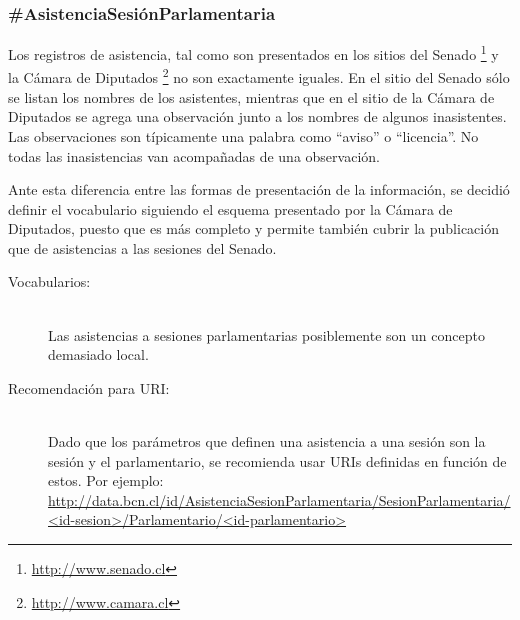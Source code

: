 \subsubsection{\#AsistenciaSesiónParlamentaria}

Los registros de asistencia, tal como son presentados en los
sitios del Senado \footnote{\url{http://www.senado.cl}} y la Cámara de
Diputados \footnote{\url{http://www.camara.cl}} no son exactamente
iguales. En el sitio del Senado sólo se listan los nombres de los
asistentes, mientras que en el sitio de la Cámara de Diputados se
agrega una observación junto a los nombres de algunos
inasistentes. Las observaciones son típicamente una palabra como
``aviso'' o ``licencia''. No todas las inasistencias van acompañadas
de una observación.

Ante esta diferencia entre las formas de presentación de la
información, se decidió definir el vocabulario siguiendo el esquema
presentado por la Cámara de Diputados, puesto que es más completo y
permite también cubrir la publicación que de asistencias a las
sesiones del Senado.

\begin{description}
  
\item[{\sf Vocabularios:}] \hfill \\
  Las asistencias a sesiones parlamentarias posiblemente son un
  concepto demasiado local.
\item[{\sf Recomendación para URI:}] \hfill \\
  Dado que los parámetros que definen una asistencia a una sesión son
  la sesión y el parlamentario, se recomienda usar URIs definidas en
  función de estos. Por ejemplo: \\
  {\scriptsize\url{http://data.bcn.cl/id/AsistenciaSesionParlamentaria/SesionParlamentaria/<id-sesion>/Parlamentario/<id-parlamentario>}}
\end{description}
